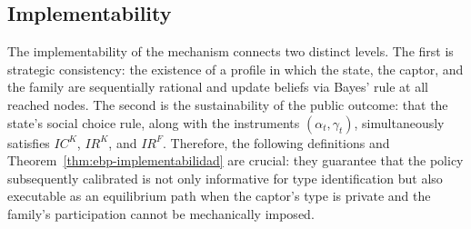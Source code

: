 \documentclass[review,authoryear,12pt]{elsarticle}
\theoremstyle{plain}
\theoremstyle{definition}
\newcommand{\1}{\mathbf{1}}
\begin{document}
\subsection{Implementability}\label{subsec:implementabilidad}

\noindent The implementability of the mechanism connects two distinct levels. The first is strategic consistency: the existence of a profile in which the state, the captor, and the family are sequentially rational and update beliefs via Bayes' rule at all reached nodes. The second is the sustainability of the public outcome: that the state's social choice rule, along with the instruments $(\alpha_t,\gamma_t)$, simultaneously satisfies $IC^K$, $IR^K$, and $IR^F$. Therefore, the following definitions and Theorem~\ref{thm:ebp-implementabilidad} are crucial: they guarantee that the policy subsequently calibrated is not only informative for type identification but also executable as an equilibrium path when the captor's type is private and the family's participation cannot be mechanically imposed.
\end{document}
